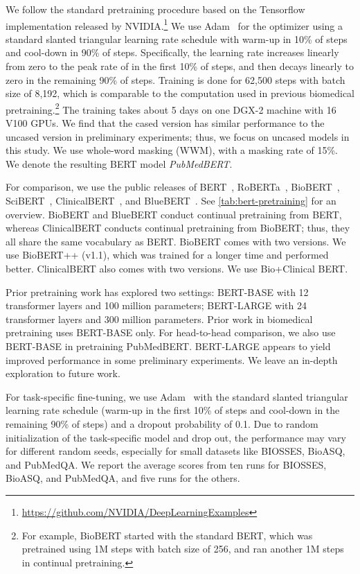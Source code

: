 \documentclass[acmlarge,screen,nonacm]{acmart}
\begin{document}
We follow the standard pretraining procedure based on the Tensorflow implementation released by NVIDIA.\footnote{\url{https://github.com/NVIDIA/DeepLearningExamples}} 
We use Adam~\cite{kingma2014adam} for the optimizer using a standard slanted triangular learning rate schedule with warm-up in 10\% of steps and cool-down in 90\% of steps. Specifically, the learning rate increases linearly from zero to the peak rate of  in the first 10\% of steps, and then decays linearly to zero in the remaining 90\% of steps. 
Training is done for 62,500 steps with batch size of 8,192, which is comparable to the computation used in previous biomedical pretraining.\footnote{For example, BioBERT started with the standard BERT, which was pretrained using 1M steps with batch size of 256, and ran another 1M steps in continual pretraining.}
The training takes about 5 days on one DGX-2 machine with 16 V100 GPUs. 
We find that the cased version has similar performance to the uncased version in preliminary experiments; thus, we focus on uncased models in this study.
We use whole-word masking (WWM), with a masking rate of 15\%. We denote the resulting BERT model {\em PubMedBERT}.

For comparison, we use the public releases of {BERT}~\cite{devlin2018bert}, {RoBERTa}~\cite{liu2019roberta}, {BioBERT}~\cite{lee2019bioberts}, {SciBERT}~\cite{beltagy2019scibert}, {ClinicalBERT}~\cite{alsentzer-etal-2019-publicly}, and {BlueBERT}~\cite{peng2019transfer}. 
See \autoref{tab:bert-pretraining} for an overview. 
BioBERT and BlueBERT conduct continual pretraining from BERT, whereas ClinicalBERT conducts continual pretraining from BioBERT; thus, they all share the same vocabulary as BERT. 
BioBERT comes with two versions. We use BioBERT++ (v1.1), which was trained for a longer time and performed better. ClinicalBERT also comes with two versions. We use Bio+Clinical BERT.

Prior pretraining work has explored two settings: BERT-BASE with 12 transformer layers and 100 million parameters; BERT-LARGE with 24 transformer layers and 300 million parameters. Prior work in biomedical pretraining uses BERT-BASE only. For head-to-head comparison, we also use BERT-BASE in pretraining PubMedBERT. BERT-LARGE appears to yield improved performance in some preliminary experiments. We leave an in-depth exploration to future work. 



For task-specific fine-tuning, we use Adam~\cite{kingma2014adam} with the standard slanted triangular learning rate schedule (warm-up in the first 10\% of steps and cool-down in the remaining 90\% of steps) and a dropout probability of 0.1. 
Due to random initialization of the task-specific model and drop out, the performance may vary for different random seeds, especially for small datasets like BIOSSES, BioASQ, and PubMedQA. We report the average scores from ten runs for BIOSSES, BioASQ, and PubMedQA, and five runs for the others. 
\end{document}
